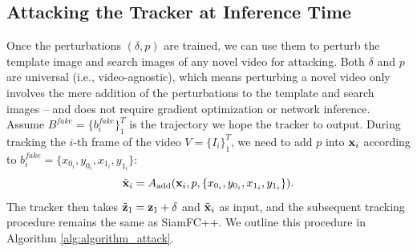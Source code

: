\documentclass[journal]{IEEEtran}
\begin{document}
\subsection{Attacking the Tracker at Inference Time}

Once the perturbations $(\delta, p)$ are trained, we can use them to perturb the template image and search images of any novel video for attacking. Both $\delta$ and $p$ are universal (i.e., video-agnostic), which means perturbing a novel video only involves the mere addition of the perturbations to the template and search images -- and does not require gradient optimization or network inference.
Assume $B^{fake}=\{b^{fake}_i\}_1^{T}$ is the trajectory we hope the tracker to output.
During tracking the $i$-th frame of the video $V=\{I_i\}_1^T$, we need to add $p$ into $\textbf x_i$ according to $b^{fake}_i=\{x_{0_i}, y_{0_i}, x_{1_i}, y_{1_i}\}$:
\begin{equation}
\tilde{\textbf x}_i = A_{\text{add}}(\textbf x_i, p, \{x_{0_i}, y_{0_i}, x_{1_i}, y_{1_i}\}).
\end{equation}
The tracker then takes $\tilde{\textbf z}_1=\textbf z_1+\delta$ and $\tilde{ \textbf x}_i$ as input, and the subsequent tracking procedure remains the same as SiamFC++.
We outline this procedure in Algorithm \ref{alg:algorithm_attack}.
\end{document}
